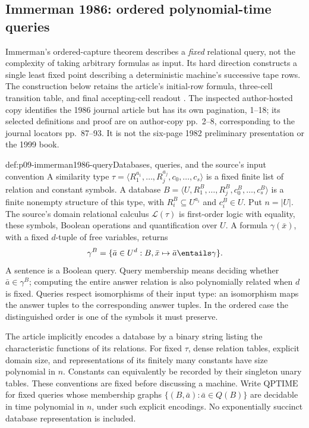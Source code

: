 
\subsection{Immerman 1986: ordered polynomial-time queries}
\label{sec:p09-n-c-004-03}

Immerman's ordered-capture theorem describes a \emph{fixed} relational
query, not the complexity of taking arbitrary formulas as input.  Its hard
direction constructs a single least fixed point describing a deterministic
machine's successive tape rows.  The construction below retains the
article's initial-row formula, three-cell transition table, and final
accepting-cell readout \cite[secs.~1--3, thm.~1 and lem.~3.1]{Immerman1986}.
The inspected author-hosted copy identifies the 1986 journal article but
has its own pagination, 1--18; its selected definitions and proof are on
author-copy pp.~2--8, corresponding to the journal locators pp.~87--93.
It is not the six-page 1982 preliminary presentation or the 1999 book.

\begin{hbdefinition}{def:p09-immerman1986-query}{Databases, queries, and the source's input convention}
A similarity type
\(\tau=\langle R_1^{a_1},\ldots,R_j^{a_j},c_0,\ldots,c_s\rangle\)
is a fixed finite list of relation and constant symbols.  A database
\(B=\langle U,R_1^B,\ldots,R_j^B,c_0^B,\ldots,c_s^B\rangle\)
is a finite nonempty structure of this type, with \(R_i^B\subseteq U^{a_i}\)
and \(c_i^B\in U\).  Put \(n=\lvert U\rvert\).
The source's domain relational calculus \(\mathcal L(\tau)\) is
first-order logic with equality, these symbols, Boolean operations and
quantification over \(U\).  A formula \(\gamma(\bar x)\), with a
fixed \(d\)-tuple of free variables, returns
\[
 \gamma^B=\{\bar a\in U^d:B,\bar x\mapsto\bar a\entails\gamma\}.
\]
A sentence is a Boolean query.  Query membership means deciding whether
\(\bar a\in\gamma^B\); computing the entire answer relation is
also polynomially related when \(d\) is fixed.
Queries respect isomorphisms of their input type: an isomorphism maps
the answer tuples to the corresponding answer tuples.  In the ordered
case the distinguished order is one of the symbols it must preserve.

The article implicitly encodes a database by a binary string listing the
characteristic functions of its relations.  For fixed \(\tau\), dense
relation tables, explicit domain size, and representations of its finitely
many constants have size polynomial in \(n\).  Constants can equivalently
be recorded by their singleton unary tables.  These conventions are fixed
before discussing a machine.  Write \(\mathrm{QPTIME}\) for fixed
queries whose membership graphs
\(\{(B,\bar a):\bar a\in Q(B)\}\) are decidable in time
polynomial in \(n\), under such explicit encodings.  No exponentially
succinct database representation is included.
\end{hbdefinition}

